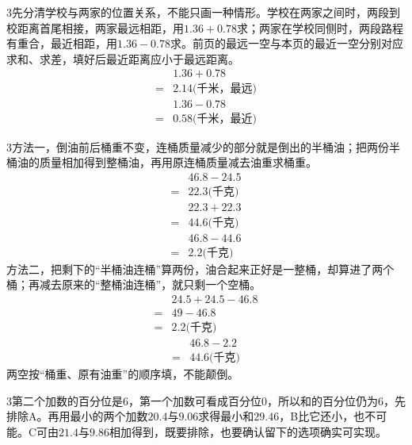 \documentclass[multi=snippet,border={5bp 20bp 5bp 5bp}]{standalone}
\newenvironment{snippet}[3]{\begin{minipage}{#1bp}\color{answerred}\fontsize{#2}{#3}\selectfont\raggedright}{\end{minipage}}
\begin{document}
\begin{snippet}{505}{11.5}{14}\begin{multicols}{3}\raggedcolumns 先分清学校与两家的位置关系，不能只画一种情形。学校在两家之间时，两段到校距离首尾相接，两家最远相距，用\(1.36+0.78\)\allowbreak 求；两家在学校同侧时，两段路程有重合，最近相距，用\(1.36-0.78\)\allowbreak 求。前页的最远一空与本页的最近一空分别对应求和、求差，填好后最近距离应小于最远距离。\[\begin{aligned}&1.36+0.78\\={}&2.14\text{(千米，最远)}\\&1.36-0.78\\={}&0.58\text{(千米，最近)}\end{aligned}\]\end{multicols}\end{snippet}
\begin{snippet}{505}{11.5}{14}\begin{multicols}{3}\raggedcolumns 方法一，倒油前后桶重不变，连桶质量减少的部分就是倒出的半桶油；把两份半桶油的质量相加得到整桶油，再用原连桶质量减去油重求桶重。\[\begin{aligned}&46.8-24.5\\={}&22.3\text{(千克)}\end{aligned}\]\[\begin{aligned}&22.3+22.3\\={}&44.6\text{(千克)}\end{aligned}\]\[\begin{aligned}&46.8-44.6\\={}&2.2\text{(千克)}\end{aligned}\]方法二，把剩下的“半桶油连桶”算两份，油合起来正好是一整桶，却算进了两个桶；再减去原来的“整桶油连桶”，就只剩一个空桶。\[\begin{aligned}&24.5+24.5-46.8\\={}&49-46.8\\={}&2.2\text{(千克)}\end{aligned}\]\[\begin{aligned}&46.8-2.2\\={}&44.6\text{(千克)}\end{aligned}\]两空按“桶重、原有油重”的顺序填，不能颠倒。\end{multicols}\end{snippet}
\begin{snippet}{505}{11.5}{14}\begin{multicols}{3}\raggedcolumns 第二个加数的百分位是6，第一个加数可看成百分位0，所以和的百分位仍为6，先排除A。再用最小的两个加数\(20.4\)\allowbreak 与\(9.06\)\allowbreak 求得最小和\(29.46\)\allowbreak ，B比它还小，也不可能。C可由\(21.4\)\allowbreak 与\(9.86\)\allowbreak 相加得到，既要排除，也要确认留下的选项确实可实现。\end{multicols}\end{snippet}
\end{document}

